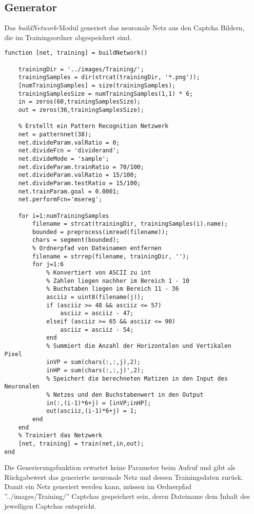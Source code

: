 \subsection{Generator}
Das \textit{buildNetwork}-Modul generiert das neuronale Netz aus den Captcha Bildern, die im Trainingsordner abgespeichert sind.
\begin{lstlisting}
function [net, training] = buildNetwork()

    trainingDir = '../images/Training/';
    trainingSamples = dir(strcat(trainingDir, '*.png'));
    [numTrainingSamples] = size(trainingSamples);
    trainingSamplesSize = numTrainingSamples(1,1) * 6;
    in = zeros(60,trainingSamplesSize);
    out = zeros(36,trainingSamplesSize);
    
    % Erstellt ein Pattern Recognition Netzwerk
    net = patternnet(38);
    net.divideParam.valRatio = 0;
    net.divideFcn = 'dividerand';
    net.divideMode = 'sample';
    net.divideParam.trainRatio = 70/100;
    net.divideParam.valRatio = 15/100;
    net.divideParam.testRatio = 15/100;
    net.trainParam.goal = 0.0001;
    net.performFcn='msereg'; 
  
    for i=1:numTrainingSamples
        filename = strcat(trainingDir, trainingSamples(i).name);  
        bounded = preprocess(imread(filename));     
        chars = segment(bounded);
        % Ordnerpfad von Dateinamen entfernen
        filename = strrep(filename, trainingDir, '');
        for j=1:6
            % Konvertiert von ASCII zu int 
            % Zahlen liegen nachher im Bereich 1 - 10
            % Buchstaben liegen im Bereich 11 - 36
            asciiz = uint8(filename(j));
            if (asciiz >= 48 && asciiz <= 57)
                asciiz = asciiz - 47;
            elseif (asciiz >= 65 && asciiz <= 90)
                asciiz = asciiz - 54;
            end
            % Summiert die Anzahl der Horizontalen und Vertikalen Pixel
            inVP = sum(chars(:,:,j),2);
            inHP = sum(chars(:,:,j)',2);
            % Speichert die berechneten Matizen in den Input des Neuronalen
            % Netzes und den Buchstabenwert in den Output
            in(:,(i-1)*6+j) = [inVP;inHP];
            out(asciiz,(i-1)*6+j) = 1;
        end
    end
    % Trainiert das Netzwerk
    [net, training] = train(net,in,out);       
end
\end{lstlisting}
Die Generierungsfunktion erwartet keine Parameter beim Aufruf und gibt als Rückgabewert das generierte neuronale Netz und dessen Trainingsdaten zurück.\\
Damit ein Netz generiert werden kann, müssen im Ordnerpfad ''../images/Training/'' Captchas gespeichert sein, deren Dateiname dem Inhalt des jeweiligen Captchas entspricht.\\
